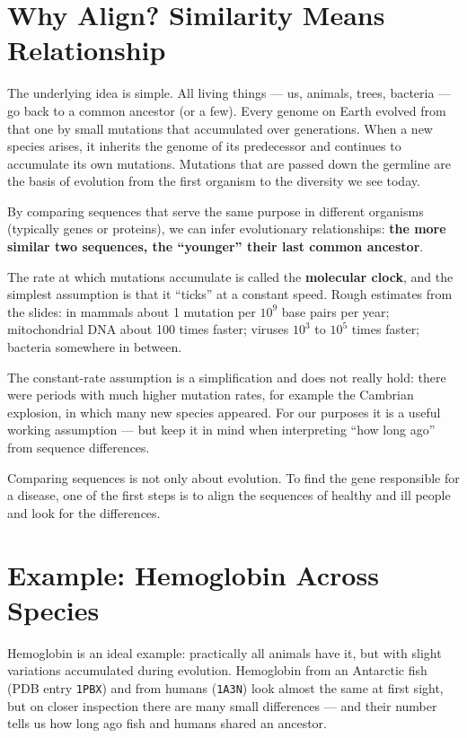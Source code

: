 \documentclass[11pt, oneside]{book}
\newcommand{\seq}[1]{\texttt{#1}}
\let\originalsection\section
\renewcommand{\section}{\Needspace{7\baselineskip}\originalsection}
\begin{document}
\section{Why Align? Similarity Means Relationship}

The underlying idea is simple. All living things --- us, animals, trees,
bacteria --- go back to a common ancestor (or a few). Every genome on Earth
evolved from that one by small mutations that accumulated over generations.
When a new species arises, it inherits the genome of its predecessor and
continues to accumulate its own mutations. Mutations that are passed down
the germline are the basis of evolution from the first organism to the
diversity we see today.

\begin{thmbox}[title={Similarity as evidence for relationship}]
By comparing sequences that serve the same purpose in different organisms
(typically genes or proteins), we can infer evolutionary relationships:
\textbf{the more similar two sequences, the ``younger'' their last common
ancestor}.
\end{thmbox}

The rate at which mutations accumulate is called the \textbf{molecular
clock}, and the simplest assumption is that it ``ticks'' at a constant speed.
Rough estimates from the slides: in mammals about 1 mutation per $10^9$ base
pairs per year; mitochondrial DNA about 100 times faster; viruses $10^3$ to
$10^5$ times faster; bacteria somewhere in between.

\begin{notebox}[title={The clock is not constant}]
The constant-rate assumption is a simplification and does not really hold:
there were periods with much higher mutation rates, for example the Cambrian
explosion, in which many new species appeared. For our purposes it is a
useful working assumption --- but keep it in mind when interpreting
``how long ago'' from sequence differences.
\end{notebox}

Comparing sequences is not only about evolution. To find the gene responsible
for a disease, one of the first steps is to align the sequences of healthy and
ill people and look for the differences.

\section{Example: Hemoglobin Across Species}

Hemoglobin is an ideal example: practically all animals have it, but with
slight variations accumulated during evolution. Hemoglobin from an Antarctic
fish (PDB entry \seq{1PBX}) and from humans (\seq{1A3N}) look almost the same
at first sight, but on closer inspection there are many small differences ---
and their number tells us how long ago fish and humans shared an ancestor.
\end{document}
